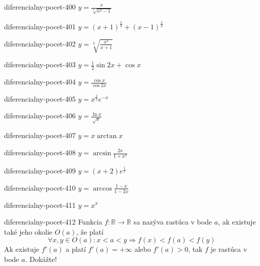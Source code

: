 \begin{defproblem}{diferencialny-pocet-400}
$y=\frac{x}{\sqrt[3]{x^2-1}}$
\end{defproblem}

\begin{defproblem}{diferencialny-pocet-401}
$y=(x+1)^{\frac{2}{3}}+(x-1)^{\frac{2}{3}}$
\end{defproblem}

\begin{defproblem}{diferencialny-pocet-402}
$y=\sqrt[3]{\frac{x^2}{x+1}}$
\end{defproblem}

\begin{defproblem}{diferencialny-pocet-403}
$y=\frac{1}{2}\sin 2x +\cos x$
\end{defproblem}

\begin{defproblem}{diferencialny-pocet-404}
$y=\frac{\cos x}{\cos 2x}$
\end{defproblem}

\begin{defproblem}{diferencialny-pocet-405}
$y=x^{\frac{2}{3}}e^{-x}$
\end{defproblem}

\begin{defproblem}{diferencialny-pocet-406}
$y=\frac{\ln x}{\sqrt{x}}$
\end{defproblem}

\begin{defproblem}{diferencialny-pocet-407}
$y=x\arctan x$
\end{defproblem}

\begin{defproblem}{diferencialny-pocet-408}
$y=\arcsin \frac{2x}{1+x^2}$
\end{defproblem}

\begin{defproblem}{diferencialny-pocet-409}
$y=(x+2)e^{\frac{1}{x}}$
\end{defproblem}

\begin{defproblem}{diferencialny-pocet-410}
$y=\arccos \frac{1-x}{1-2x}$
\end{defproblem}

\begin{defproblem}{diferencialny-pocet-411}
$y=x^x$
\end{defproblem}

\begin{defproblem}{diferencialny-pocet-412}
Funkcia $f:\mathbb{R}\rightarrow\mathbb{R}$ sa nazýva rastúca v bode $a$, ak
existuje také jeho okolie $O(a)$, že platí
\[
  \forall x,y\in O(a):x<a<y\Rightarrow f(x)<f(a)<f(y)
\]
Ak existuje $f'(a)$ a platí $f'(a)=+\infty$ alebo $f'(a)>0$, tak $f$ je rastúca
v bode $a$. Dokážte!
\end{defproblem}

